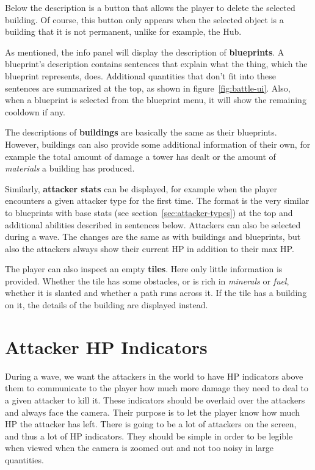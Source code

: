 Below the description is a button that allows the player to delete the selected building.
Of course, this button only appears when the selected object is a building that it is not permanent, unlike for example, the Hub.

As mentioned, the info panel will display the description of \textbf{blueprints}.
A blueprint's description contains sentences that explain what the thing, which the blueprint represents, does.
Additional quantities that don't fit into these sentences are summarized at the top, as shown in figure~\ref{fig:battle-ui}.
Also, when a blueprint is selected from the blueprint menu, it will show the remaining cooldown if any.

The descriptions of \textbf{buildings} are basically the same as their blueprints.
However, buildings can also provide some additional information of their own, for example the total amount of damage a tower has dealt or the amount of \emph{materials} a building has produced.

Similarly, \textbf{attacker stats} can be displayed, for example when the player encounters a given attacker type for the first time.
The format is the very similar to blueprints with base stats (see section~\ref{sec:attacker-types}) at the top and additional abilities described in sentences below.
Attackers can also be selected during a wave.
The changes are the same as with buildings and blueprints, but also the attackers always show their current HP in addition to their max HP.

The player can also inspect an empty \textbf{tiles}.
Here only little information is provided.
Whether the tile has some obstacles, or is rich in \emph{minerals} or \emph{fuel}, whether it is slanted and whether a path runs across it.
If the tile has a building on it, the details of the building are displayed instead.

\section{Attacker HP Indicators}

During a wave, we want the attackers in the world to have HP indicators above them to communicate to the player how much more damage they need to deal to a given attacker to kill it.
These indicators should be overlaid over the attackers and always face the camera.
Their purpose is to let the player know how much HP the attacker has left.
There is going to be a lot of attackers on the screen, and thus a lot of HP indicators.
They should be simple in order to be legible when viewed when the camera is zoomed out and not too noisy in large quantities.

